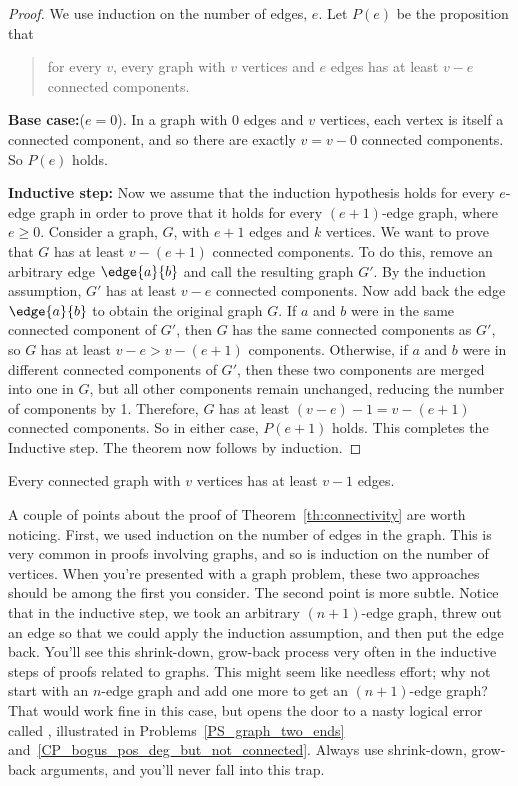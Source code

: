 \begin{proof}
We use induction on the number of edges, $e$.  Let $P(e)$ be the
proposition that
\begin{quote}
for every $v$, every graph with $v$ vertices and $e$ edges has at least
$v-e$ connected components.
\end{quote}

\textbf{Base case:}($e=0$).  In a graph with 0 edges and $v$ vertices,
each vertex is itself a connected component, and so there are exactly $v =
v - 0$ connected components.  So $P(e)$ holds.

\textbf{Inductive step:} Now we assume that the induction hypothesis holds
for every $e$-edge graph in order to prove that it holds for every
$(e+1)$-edge graph, where $e \geq 0$.
Consider a graph, $G$, with $e + 1$ edges and $k$ vertices.  We want to
prove that $G$ has at least $v - (e+1)$ connected components.
To do this, remove an arbitrary edge $\edge{a}{b}$ and call the resulting
graph $G'$.  By the induction assumption, $G'$ has at least $v - e$
connected components.
Now add back the edge $\edge{a}{b}$ to obtain the original graph $G$.  If
$a$ and $b$ were in the same connected component of $G'$, then $G$ has the
same connected components as $G'$, so $G$ has at least $v -e > v - (e+1)$
components.  Otherwise, if $a$ and $b$ were in different connected
components of $G'$, then these two components are merged into one in $G$,
but all other components remain unchanged, reducing the number of
components by 1.  Therefore, $G$ has at least $(v - e) - 1 = v - (e+1)$
connected components.  So in either case, $P(e+1)$ holds.  This completes
the Inductive step.
The theorem now follows by induction.
\end{proof}

\begin{corollary}
\label{cor:n-1}
Every connected graph with $v$ vertices has at least $v - 1$ edges.
\end{corollary}

A couple of points about the proof of Theorem~\ref{th:connectivity} are
worth noticing.  First, we used induction on the number of
edges in the graph.  This is very common in proofs involving graphs, and
so is induction on the number of vertices.  When you're presented with a
graph problem, these two approaches should be among the first you
consider.  The second point is more subtle.  Notice that in the inductive
step, we took an arbitrary $(n+1)$-edge graph, threw out an edge so that
we could apply the induction assumption, and then put the edge back.
You'll see this shrink-down, grow-back process very often in the inductive
steps of proofs related to graphs.  This might seem like needless effort;
why not start with an $n$-edge graph and add one more to get an
$(n+1)$-edge graph?  That would work fine in this case, but opens the door
to a nasty logical error called , illustrated in
Problems~\ref{PS_graph_two_ends} and~\ref{CP_bogus_pos_deg_but_not_connected}.
Always use shrink-down, grow-back arguments, and you'll never fall into
this trap.

